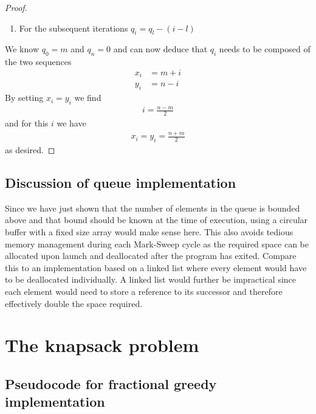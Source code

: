 \documentclass{article}
\begin{document}
\begin{proof}
\begin{enumerate}
        \item For the subsequent iterations $q_i = q_l - (i - l)$
    \end{enumerate}
    We know $q_0 = m$ and $q_n=0$ and can now deduce that $q_i$ needs to be composed of
    the two sequences
    \begin{align*}
        x_i &= m + i\\
        y_i &= n - i
    \end{align*}
    By setting $x_i=y_i$ we find
    \begin{align*}
        i = \frac{n-m}{2}
    \end{align*} 
    and for this $i$ we have
    \begin{align*}
        x_i = y_i = \frac{n+m}{2}
    \end{align*}
    as desired.
    

\end{proof}

\subsection{Discussion of queue implementation}

Since we have just shown that the number of elements in the queue is bounded
above and that bound should be known at the time of execution, using a
circular buffer with a fixed size array would make sense here. This also avoids 
tedious memory management during each Mark-Sweep cycle as the required
space can be allocated upon launch and deallocated after the program has exited.
Compare this to an implementation based on a linked list where every element would
have to be deallocated individually. A linked list would further be impractical
since each element would need to store a reference to its successor and therefore
effectively double the space required.


\section{The knapsack problem}


\subsection{Pseudocode for fractional greedy implementation}
\end{document}
